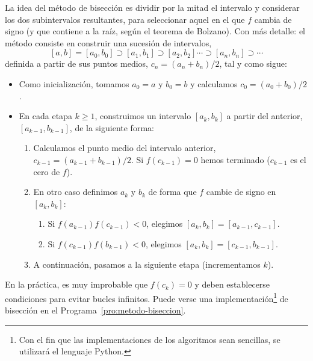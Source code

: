 La idea del método de bisección es dividir por la mitad el intervalo y
considerar los dos subintervalos resultantes, para seleccionar aquel
en el que $f$ cambia de signo (y que contiene a la raíz, según el
teorema de Bolzano). Con más detalle: el método consiste en construir
una sucesión de intervalos,
\begin{equation}
  \label{eq:tema1:bisecc:0}
  [a,b]=[a_0,b_0] \supset [a_1,b_1] \supset [a_2,b_2] \cdots \supset
  [a_n,b_n] \supset \cdots
\end{equation}
definida a partir de sus puntos medios, $c_n=(a_n+b_n)/2$, tal y como sigue:
\begin{itemize}
\item Como inicialización, tomamos $a_0=a$ y $b_0=b$ y calculamos
  $c_0=(a_0+b_0)/2$.
\item En cada etapa $k\ge 1$, construimos un intervalo $[a_k,b_k]$ a
  partir del anterior, $[a_{k-1}, b_{k-1}]$, de la siguiente forma:
  \begin{enumerate}
  \item Calculamos el punto medio del intervalo anterior,
    $c_{k-1}=(a_{k-1}+b_{k-1})/2$. Si $f(c_{k-1})=0$ hemos terminado
    ($c_{k-1}$ es el cero de $f$).
  \item En otro caso definimos $a_k$ y $b_k$ de forma que $f$ cambie de
    signo en $[a_k,b_k]$:
    \begin{enumerate}
    \item Si $f(a_{k-1})f(c_{k-1})<0$, elegimos $[a_k,b_k]=[a_{k-1}, c_{k-1}]$.
    \item Si $f(c_{k-1})f(b_{k-1})<0$, elegimos $[a_k,b_k]=[c_{k-1}, b_{k-1}]$.
    \end{enumerate}
  \item A continuación, pasamos a la siguiente etapa (incrementamos
    $k$).
  \end{enumerate}
\end{itemize}

En la práctica, es muy improbable que $f(c_k)=0$ y deben establecerse
condiciones para evitar bucles infinitos. Puede verse una
implementación\footnote{Con el fin que las
  implementaciones de los algoritmos sean sencillas, se utilizará el
  lenguaje Python.} de bisección en el
Programa~\ref{pro:metodo-biseccion}.

